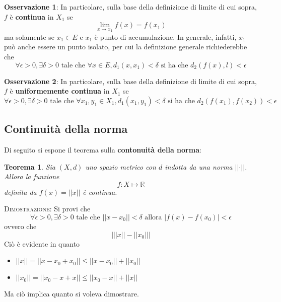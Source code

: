 \documentclass[a4paper]{extarticle}
\newtheorem{theorem}{Teorema}[section]
\begin{document}
\vspace{1em}
\noindent
\textbf{Osservazione 1}: In particolare, sulla base della definizione di limite di cui sopra, $f$ è \textbf{continua} in $X_1$ se
\[\lim_{x \to x_1} f(x) = f(x_1)\]
ma solamente se $x_1 \in E$ e $x_1$ è punto di accumulazione. In generale, infatti, $x_1$ può anche essere un punto isolato, per cui la definizione generale richiederebbe che
\[\forall \epsilon>0, \exists \delta>0 \text{ tale che } \forall x \in E, d_1(x,x_1) < \delta \text{ si ha che } d_2(f(x),l) < \epsilon\]

\vspace{1em}
\noindent
\textbf{Osservazione 2}: In particolare, sulla base della definizione di limite di cui sopra, $f$ è \textbf{uniformemente continua} in $X_1$ se
\[\forall \epsilon>0, \exists \delta>0 \text{ tale che } \forall x_1,y_1 \in X_1, d_1(x_1,y_1) < \delta \text{ si ha che } d_2(f(x_1),f(x_2)) < \epsilon\]

\vspace{1em}
\noindent
\subsection{Continuità della norma}
Di seguito si espone il teorema sulla \textbf{contonuità della norma}:

\begin{theorem}
    Sia $(X,d)$ uno spazio metrico con $d$ indotta da una norma $\left \vert \left \vert \cdot \right \vert \right \vert$. Allora la funzione
    \[f : X \longmapsto \mathbb{R}\]
    definita da $f(x) = \left \vert \left \vert x \right \vert \right \vert$ è continua.
\end{theorem}

\vspace{2em}
\noindent
\normalfont \normalsize
\textsc{Dimostrazione}: Si provi che
\[\forall \epsilon > 0, \exists \delta > 0 \text{ tale che } \left \vert \left \vert x-x_0 \right \vert \right \vert < \delta \text{ allora } \left \vert f(x)-f(x_0)\right \vert < \epsilon\]
ovvero che
\[\left \vert \left \vert \left \vert x \right \vert \right \vert - \left \vert \left \vert x_0 \right \vert \right \vert \right \vert\]
Ciò è evidente in quanto
\begin{itemize}
    \item $\left \vert \left \vert x \right \vert \right \vert = \left \vert \left \vert x-x_0+x_0 \right \vert \right \vert \leq \left \vert \left \vert x-x_0 \right \vert \right \vert + \left \vert \left \vert x_0 \right \vert \right \vert$
    \item $\left \vert \left \vert x_0 \right \vert \right \vert = \left \vert \left \vert x_0-x+x \right \vert \right \vert \leq \left \vert \left \vert x_0-x \right \vert \right \vert + \left \vert \left \vert x \right \vert \right \vert$
\end{itemize}
Ma ciò implica quanto si voleva dimostrare.
\end{document}
